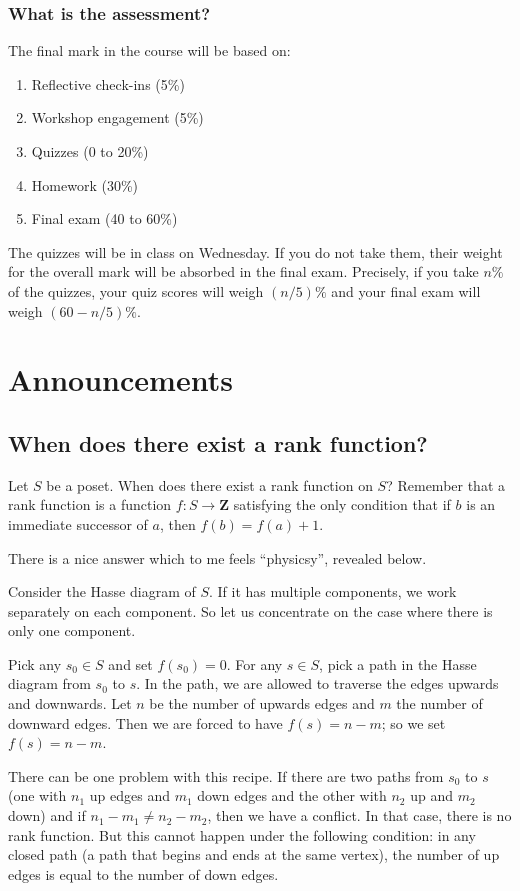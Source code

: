 \documentclass{amsart}
\begin{document}
\subsubsection*{What is the assessment?}
\label{sec:orgad1aaa0}
The final mark in the course will be based on:

\begin{enumerate}
\item Reflective check-ins (5\%)
\item Workshop engagement (5\%)
\item Quizzes (0 to 20\%)
\item Homework (30\%)
\item Final exam (40 to 60\%)
\end{enumerate}

The quizzes will be in class on Wednesday.
If you do not take them, their weight for the overall mark will be absorbed in the final exam.
Precisely, if you take \(n\%\) of the quizzes, your quiz scores will weigh \((n/5)\%\) and your final exam will weigh \((60-n/5)\%\).
\section{Announcements}
\label{sec:orgec12052}
\subsection{When does there exist a rank function?}
\label{sec:orgd16dcbd}
Let \(S\) be a poset.
When does there exist a rank function on \(S\)?
Remember that a rank function is a function \(f \colon S \to \mathbf{Z}\) satisfying the only condition that if \(b\) is an immediate successor of \(a\), then \(f(b) = f(a) + 1\).


There is a nice answer which to me feels ``physicsy'', revealed below.

Consider the Hasse diagram of \(S\).
If it has multiple components, we work separately on each component.
So let us concentrate on the case where there is only one component.

Pick any \(s_0 \in S\) and set \(f(s_0) = 0\).
For any \(s \in S\), pick a path in the Hasse diagram from \(s_0\) to \(s\).
In the path, we are allowed to traverse the edges upwards and downwards.
Let \(n\) be the number of upwards edges and \(m\) the number of downward edges.
Then we are forced to have \(f(s) = n-m\); so we set \(f(s) = n-m\).

There can be one problem with this recipe.
If there are two paths from \(s_0\) to \(s\) (one with \(n_1\) up edges and \(m_1\) down edges and the other with \(n_2\) up and \(m_2\) down) and if \(n_1 - m_1 \neq n_2 - m_2\), then we have a conflict.
In that case, there is no rank function.
But this cannot happen under the following condition: in any closed path (a path that begins and ends at the same vertex), the number of up edges is equal to the number of down edges.
\end{document}
